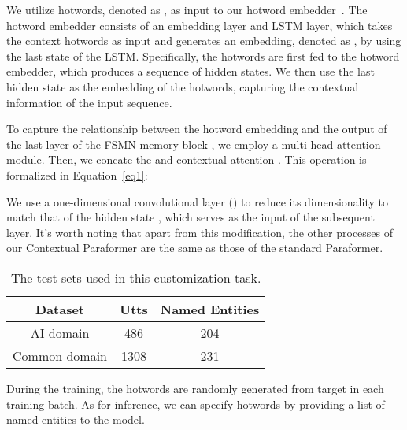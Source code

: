 \documentclass{INTERSPEECH2023}
\begin{document}
We utilize hotwords, denoted as , as input to our hotword embedder~\cite{pundak2018deep}. The hotword embedder consists of an embedding layer and LSTM layer, which takes the context hotwords as input and generates an embedding, denoted as , by using the last state of the LSTM. Specifically, the hotwords are first fed to the hotword embedder, which produces a sequence of hidden states. We then use the last hidden state as the embedding of the hotwords, capturing the contextual information of the input sequence.


To capture the relationship between the hotword embedding  and the output of the last layer of the FSMN memory block , we employ a multi-head attention module. Then, we concate the  and contextual attention . This operation is formalized in Equation~\ref{eq1}:





We use a one-dimensional convolutional layer () to reduce its dimensionality to match that of the hidden state , which serves as the input of the subsequent layer. It's worth noting that apart from this modification, the other processes of our Contextual Paraformer are the same as those of the standard Paraformer. 

\begin{table}[h]
\vspace{-1mm}
    \centering
    \caption{The test sets used in this customization task.}
    \vspace{-2mm}
    \begin{tabular}{ccc}
        \midrule
        Dataset & Utts & Named Entities \\
        \midrule
        AI domain & 486 & 204 \\
        Common domain & 1308 & 231 \\
        \midrule
    \end{tabular}
    \label{tab:customization_testset}
    \vspace{-3mm}
\end{table}

During the training, the hotwords are randomly generated from target in each training batch. As for inference, we can specify hotwords  by providing a list of named entities to the model.
\end{document}
